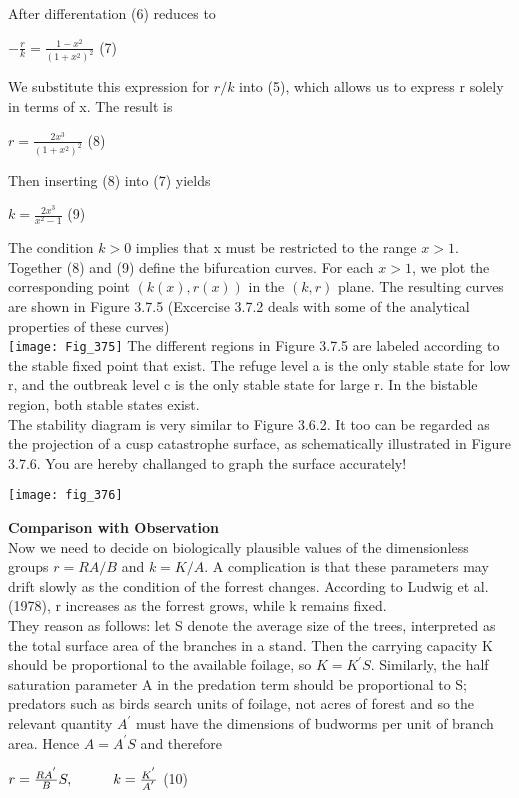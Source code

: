 \documentclass{article}
\newcommand\tab[1][1cm]{\hspace*{#1}}
\begin{document}
After differentation (6) reduces to 
\begin{center}
$-\frac{r}{k}=\frac{1-x^{2}}{(1+x^{2})^{2}}$ \tab (7)
\end{center}
We substitute this expression for $r/k$ into (5), which allows us to express r solely in terms of x. The result is
\begin{center}
$r=\frac{2x^{3}}{(1+x^{2})^{2}}$ \tab (8)
\end{center}

Then inserting (8) into (7) yields

\begin{center}
$k=\frac{2x^{3}}{x^{2}-1}$ \tab (9)
\end{center}

The condition $k>0$ implies that x must be restricted to the range $x>1$. \\ \tab Together (8) and (9) define the bifurcation curves. For each $x>1$, we plot the corresponding point $(k(x),r(x))$ in the $(k,r)$ plane. The resulting curves are shown in Figure 3.7.5 (Excercise 3.7.2 deals with some of the analytical properties of these curves)
\\
\texttt{[image: Fig\_375]}
The different regions in Figure 3.7.5 are labeled according to the stable fixed point that exist. The refuge level a is the only stable state for low r, and the outbreak level c is the only stable state for large r. In the bistable region, both stable states exist. \\ \tab
The stability diagram is very similar to Figure 3.6.2. It too can be regarded as the projection of a cusp catastrophe surface, as schematically illustrated in Figure 3.7.6. You are hereby challanged to graph the surface accurately!

\texttt{[image: fig\_376]}

\textbf {Comparison with Observation} \\ \tab
Now we need to decide on biologically plausible values of the dimensionless groups $r=RA/B$ and $k=K/A$. A complication is that these parameters may drift slowly as the condition of the forrest changes. According to Ludwig et al. (1978), r increases as the forrest grows, while k remains fixed. \\ \tab 
They reason as follows: let S denote the average size of the trees, interpreted as the total surface area of the branches in a stand. Then the carrying capacity K should be proportional to the available foilage, so $K=K^{'}S$. Similarly, the half saturation parameter A in the predation term should be proportional to S; predators such as birds search units of foilage, not acres of forest and so the relevant quantity $A^{'}$ must have the dimensions of budworms per unit of branch area. Hence $A=A^{'}S$ and therefore
\begin{center}
$r=\frac{RA^{'}}{B}S, \tab k=\frac{K^{'}}{A^{'}}$ \tab (10)
\end{center}
\end{document}
